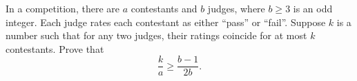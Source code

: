 In a competition, there are $a$ contestants
and $b$ judges, where $b \ge 3$ is an odd integer.
Each judge rates each contestant as either ``pass'' or ``fail''.
Suppose $k$ is a number such that for any two judges,
their ratings coincide for at most $k$ contestants.
Prove that
\[ \frac ka \ge \frac{b-1}{2b}. \]